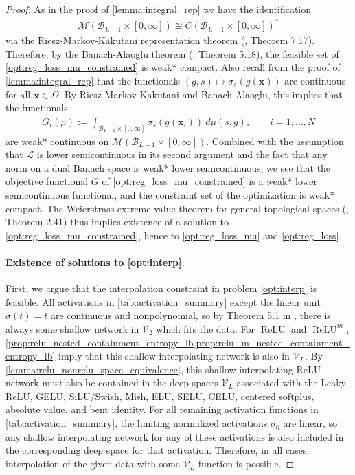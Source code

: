 \documentclass{article}
\DeclareMathOperator{\ReLU}{\mathrm{ReLU}}
\def\vx{{\bm{x}}}
\def\cB{{\mathcal{B}}}
\def\cL{{\mathcal{L}}}
\def\cM{{\mathcal{M}}}
\def\cV{{\mathcal{V}}}
\begin{document}
\begin{appendices}
\begin{proof}
    
    As in the proof of \cref{lemma:integral_rep} we have the identification 
    \begin{align}
        \cM(\cB_{L-1} \times [0,\infty]) \cong C(\cB_{L-1} \times [0,\infty])^*
    \end{align}
    via the Riesz-Markov-Kakutani representation theorem (\cite{folland1999real}, Theorem 7.17). Therefore, by the Banach-Alaoglu theorem (\cite{folland1999real}, Theorem 5.18), the feasible set of \eqref{opt:reg_loss_mu_constrained} is weak* compact. Also recall from the proof of \cref{lemma:integral_rep} that the functionals $(g,s) \mapsto \sigma_s(g(\vx))$ are continuous for all $\vx \in \Omega$. By Riesz-Markov-Kakutani and Banach-Alaoglu, this implies that the functionals 
    \begin{align} \label{eq:G_i}
        G_i (\mu) := \int_{\cB_{L-1} \times [0,\infty]} \sigma_s(g(\vx_i)) \ d \mu(s,g), \qquad i = 1, \dots, N
    \end{align}
    are weak* continuous on $\cM(\cB_{L-1} \times [0,\infty])$. Combined with the assumption that $\cL$ is lower semicontinuous in its second argument and the fact that any norm on a dual Banach space is weak* lower semicontinuous, we see that the objective functional $G$ of  \eqref{opt:reg_loss_mu_constrained} is a weak* lower semicontinuous functional, and the constraint set of the optimization is weak* compact. The Weierstrass extreme value theorem for general topological spaces (\cite{aliprantis2006infinite}, Theorem 2.41) thus implies existence of a solution to \eqref{opt:reg_loss_mu_constrained}, hence to \eqref{opt:reg_loss_mu} and \eqref{opt:reg_loss}.

    \paragraph{Existence of solutions to \eqref{opt:interp}.} 
    First, we argue that the interpolation constraint in problem \eqref{opt:interp} is feasible. All activations in \cref{tab:activation_summary} except the linear unit $\sigma(t) = t$ are continuous and nonpolynomial, so by Theorem 5.1 in \cite{pinkus1999approximation}, there is always some shallow network in $\cV_2$ which fits the data. For $\ReLU$ and $\ReLU^m$, \cref{prop:relu_nested_containment_entropy_lb,prop:relu_m_nested_containment_entropy_lb} imply that this shallow interpolating network is also in $\cV_L$. By \cref{lemma:relu_nonrelu_space_equivalence}, this shallow interpolating ReLU network must also be contained in the deep spaces $\cV_L$ associated with the Leaky ReLU, GELU, SiLU/Swish, Mish, ELU, SELU, CELU, centered softplus, absolute value, and bent identity. For all remaining activation functions in \cref{tab:activation_summary}, the limiting normalized activations $\sigma_0$ are linear, so any shallow interpolating network for any of these activations is also included in the corresponding deep space for that activation. Therefore, in all cases, interpolation of the given data with some $\cV_L$ function is possible.


\end{proof}
\end{appendices}
\end{document}
